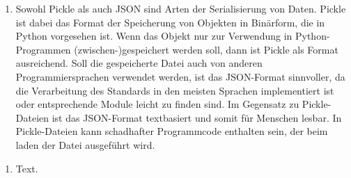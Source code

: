 \documentclass[fleqn]{article}
\begin{document}
\begin{enumerate}[{Aufgabe} 6.2]
\item
    Sowohl Pickle als auch JSON sind Arten der Serialisierung von Daten. Pickle
    ist dabei das Format der Speicherung von Objekten in Binärform, die in Python
    vorgesehen ist. Wenn das Objekt nur zur Verwendung in Python-Programmen
    (zwischen-)gespeichert werden soll, dann ist Pickle als Format ausreichend.
    Soll die gespeicherte Datei auch von anderen Programmiersprachen verwendet werden,
    ist das JSON-Format sinnvoller, da die Verarbeitung des Standards in den meisten
    Sprachen implementiert ist oder entsprechende Module leicht zu finden sind.
    Im Gegensatz zu Pickle-Dateien ist das JSON-Format textbasiert und somit für
    Menschen lesbar. In Pickle-Dateien kann schadhafter Programmcode enthalten sein,
    der beim laden der Datei ausgeführt wird.
\end{enumerate}

\begin{enumerate}[{Aufgabe} 6.4]
\item
    Text.
\end{enumerate}
\end{document}
